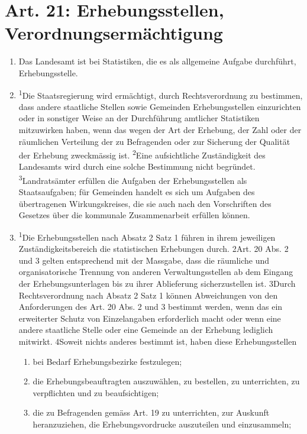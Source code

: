     \section{Art. 21: Erhebungsstellen, Verordnungsermächtigung}
        \begin{enumerate}[label=(\arabic*)]
            \item Das Landesamt ist bei Statistiken, die es als allgemeine Aufgabe durchführt, Erhebungsstelle.
            \item \textsuperscript{1}Die Staatsregierung wird ermächtigt, durch Rechtsverordnung zu bestimmen, dass andere staatliche Stellen sowie Gemeinden Erhebungsstellen einzurichten oder in sonstiger Weise an der Durchführung amtlicher Statistiken mitzuwirken haben, wenn das wegen der Art der Erhebung, der Zahl oder der räumlichen Verteilung der zu Befragenden oder zur Sicherung der Qualität der Erhebung zweckmässig ist. \textsuperscript{2}Eine aufsichtliche Zuständigkeit des Landesamts wird durch eine solche Bestimmung nicht begründet. \textsuperscript{3}Landratsämter erfüllen die Aufgaben der Erhebungsstellen als Staatsaufgaben; für Gemeinden handelt es sich um Aufgaben des übertragenen Wirkungskreises, die sie auch nach den Vorschriften des Gesetzes über die kommunale Zusammenarbeit erfüllen können.
            \item \textsuperscript{1}Die Erhebungsstellen nach Absatz 2 Satz 1 führen in ihrem jeweiligen Zu\-stän\-dig\-keits\-be\-reich die statistischen Erhebungen durch. 2Art. 20 Abs. 2 und 3 gelten entsprechend mit der Massgabe, dass die räumliche und organisatorische Trennung von anderen Verwaltungsstellen ab dem Eingang der Erhebungsunterlagen bis zu ihrer Ablieferung sicherzustellen ist. 3Durch Rechtsverordnung nach Absatz 2 Satz 1 können Abweichungen von den Anforderungen des Art. 20 Abs. 2 und 3 bestimmt werden, wenn das ein erweiterter Schutz von Einzelangaben erforderlich macht oder wenn eine andere staatliche Stelle oder eine Gemeinde an der Erhebung lediglich mitwirkt. 4Soweit nichts anderes bestimmt ist, haben diese Erhebungsstellen
                \begin{enumerate}[label=\arabic*.]
                    \item bei Bedarf Erhebungsbezirke festzulegen;
                    \item die Erhebungsbeauftragten auszuwählen, zu bestellen, zu unterrichten, zu verpflichten und zu beaufsichtigen;
                    \item die zu Befragenden gemäss Art. 19 zu unterrichten, zur Auskunft heranzuziehen, die Erhebungsvordrucke auszuteilen und einzusammeln;

\end{enumerate}
\end{enumerate}
